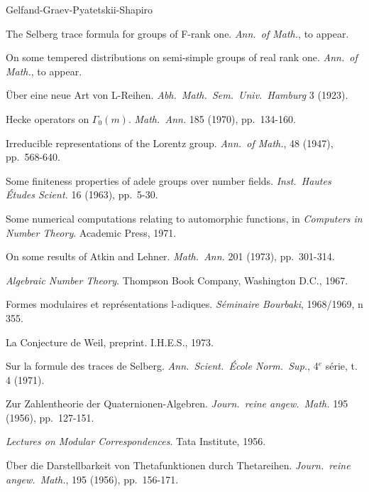 ﻿\begin{thebibliography}{Gelfand-Graev-Pyatetskii-Shapiro}
\small

 The Selberg trace formula for groups of F-rank one. \emph{Ann.\ of Math.}, to appear.

 On some tempered distributions on semi-simple groups of real rank one. \emph{Ann.\ of Math.}, to appear.

 \"Uber eine neue Art von L-Reihen. \emph{Abh.\ Math.\ Sem.\ Univ.\ Hamburg} 3 (1923).

 Hecke operators on $\Gamma_0(m)$. \emph{Math.\ Ann.} 185 (1970), pp.\ 134-160.

 Irreducible representations of the Lorentz group. \emph{Ann.\ of Math.}, 48 (1947), pp.\ 568-640.

 Some finiteness properties of adele groups over number fields. \emph{Inst.\ Hautes \'Etudes Scient.} 16 (1963), pp.\ 5-30.

 Some numerical computations relating to automorphic functions, in \emph{Computers in Number Theory}. Academic Press, 1971.

 On some results of Atkin and Lehner. \emph{Math.\ Ann.} 201 (1973), pp.\ 301-314.

 \emph{Algebraic Number Theory}. Thompson Book Company, Washington D.C., 1967.

 Formes modulaires et repr\'esentations l-adiques. \emph{S\'eminaire Bourbaki}, 1968/1969, n\textdegree{} 355.

 La Conjecture de Weil, preprint. I.H.E.S., 1973.

 Sur la formule des traces de Selberg. \emph{Ann.\ Scient.\ \'Ecole Norm.\ Sup.}, 4$^{e}$ s\'erie, t. 4 (1971).

 Zur Zahlentheorie der Quaternionen-Algebren. \emph{Journ.\ reine angew.\ Math.} 195 (1956), pp.\ 127-151.

 \emph{Lectures on Modular Correspondences}. Tata Institute, 1956.

 \"Uber die Darstellbarkeit von Thetafunktionen durch Thetareihen. \emph{Journ.\ reine angew.\ Math.}, 195 (1956), pp.\ 156-171.


\end{thebibliography}
